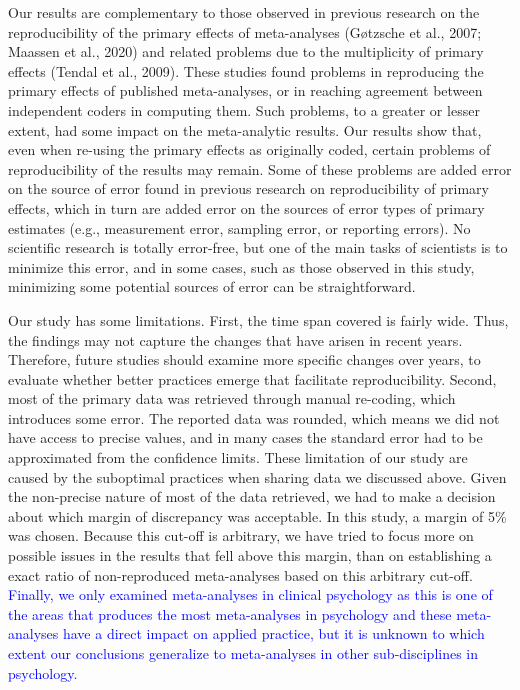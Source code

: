 \documentclass[
  ,man,floatsintext]{apa6}
\begin{document}
Our results are complementary to those observed in previous research on the reproducibility of the primary effects of meta-analyses (Gøtzsche et al., 2007; Maassen et al., 2020) and related problems due to the multiplicity of primary effects (Tendal et al., 2009). These studies found problems in reproducing the primary effects of published meta-analyses, or in reaching agreement between independent coders in computing them. Such problems, to a greater or lesser extent, had some impact on the meta-analytic results. Our results show that, even when re-using the primary effects as originally coded, certain problems of reproducibility of the results may remain. Some of these problems are added error on the source of error found in previous research on reproducibility of primary effects, which in turn are added error on the sources of error types of primary estimates (e.g., measurement error, sampling error, or reporting errors). No scientific research is totally error-free, but one of the main tasks of scientists is to minimize this error, and in some cases, such as those observed in this study, minimizing some potential sources of error can be straightforward.

Our study has some limitations. First, the time span covered is fairly wide. Thus, the findings may not capture the changes that have arisen in recent years. Therefore, future studies should examine more specific changes over years, to evaluate whether better practices emerge that facilitate reproducibility. Second, most of the primary data was retrieved through manual re-coding, which introduces some error. The reported data was rounded, which means we did not have access to precise values, and in many cases the standard error had to be approximated from the confidence limits. These limitation of our study are caused by the suboptimal practices when sharing data we discussed above. Given the non-precise nature of most of the data retrieved, we had to make a decision about which margin of discrepancy was acceptable. In this study, a margin of 5\% was chosen. Because this cut-off is arbitrary, we have tried to focus more on possible issues in the results that fell above this margin, than on establishing a exact ratio of non-reproduced meta-analyses based on this arbitrary cut-off. \textcolor{blue}{Finally, we only examined meta-analyses in clinical psychology as this is one of the areas that produces the most meta-analyses in psychology and these meta-analyses have a direct impact on applied practice, but it is unknown to which extent our conclusions generalize to meta-analyses in other sub-disciplines in psychology.}
\end{document}
